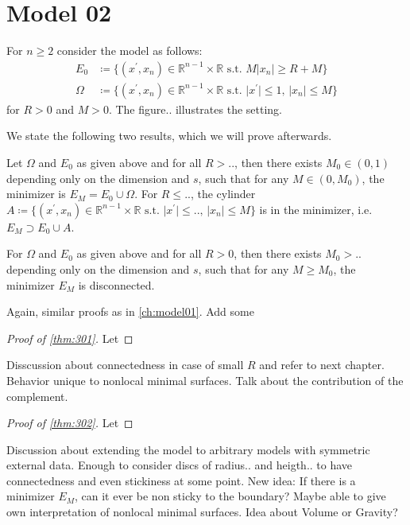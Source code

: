 \chapter{Model 02}
\label{ch:model02}

For \( n \geq 2 \) consider the model as follows:
\begin{align}
	E_0    & \coloneqq \{(x^\prime,x_n) \in \mathbb{R}^{n-1} \times \mathbb{R} \text{ s.t. } M \lvert x_n \rvert \geq R+M \} \\
	\Omega & \coloneqq \{(x^\prime,x_n) \in \mathbb{R}^{n-1} \times \mathbb{R} \text{ s.t. } \lvert x^\prime \rvert \leq 1, \, \lvert x_n \rvert \leq M \}
\end{align}
for \( R > 0 \) and \( M > 0 \). The figure.. illustrates the setting.


We state the following two results, which we will prove afterwards.

\begin{theorem}
	\label{thm:301}
	Let \( \Omega \) and \( E_0 \) as given above and for all \( R >.. \), then there
	exists \( M_0 \in (0,1) \) depending only on the dimension and \( s \), such that
	for any \( M \in (0, M_0) \), the minimizer is \( E_M = E_0 \cup \Omega \). For \( R
	\leq.. \), the cylinder \( A \coloneqq \{(x^\prime,x_n) \in \mathbb{R}^{n-1} \times
	\mathbb{R} \text{ s.t.~} \lvert x^\prime \rvert \leq.., \, \lvert x_n \rvert \leq M
	\} \) is in the minimizer, i.e.\ \( E_M \supset E_0 \cup A \).
\end{theorem}

\begin{theorem}
	\label{thm:302}
	For \( \Omega \) and \( E_0 \) as given above and for all \( R > 0 \), then there
	exists \( M_0 >.. \) depending only on the dimension and \( s \), such that
	for any \( M \geq M_0 \), the minimizer \( E_M \) is disconnected.
\end{theorem}

Again, similar proofs as in \cref{ch:model01}. \newline
Add some

\begin{proof}[Proof of \cref{thm:301}]
	Let
\end{proof}

Disscussion about connectedness in case of small \( R \) and refer to next chapter.
Behavior unique to nonlocal minimal surfaces.\newline
Talk about the contribution of the complement.

\begin{proof}[Proof of \cref{thm:302}]
	Let
\end{proof}

Discussion about extending the model to arbitrary models with symmetric external data.
Enough to consider discs of radius.. and heigth.. to have connectedness and even
stickiness at some point.\newline
New idea: If there is a minimizer \( E_M \), can it ever be non sticky to the boundary?\newline
Maybe able to give own interpretation of nonlocal minimal surfaces. Idea about Volume or
Gravity?

